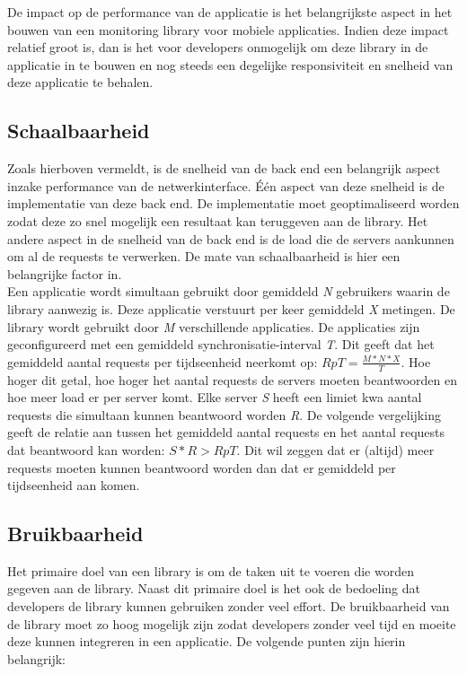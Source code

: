 De impact op de performance van de applicatie is het belangrijkste aspect in het bouwen van een monitoring library voor mobiele applicaties. Indien deze impact relatief groot is, dan is het voor developers onmogelijk om deze library in de applicatie in te bouwen en nog steeds een degelijke responsiviteit en snelheid van deze applicatie te behalen. 

\subsection{Schaalbaarheid}
Zoals hierboven vermeldt, is de snelheid van de back end een belangrijk aspect inzake performance van de netwerkinterface. \'E\'en aspect van deze snelheid is de implementatie van deze back end. De implementatie moet geoptimaliseerd worden zodat deze zo snel mogelijk een resultaat kan teruggeven aan de library. Het andere aspect in de snelheid van de back end is de load die de servers aankunnen om al de requests te verwerken. De mate van schaalbaarheid is hier een belangrijke factor in. \\

Een applicatie wordt simultaan gebruikt door gemiddeld \textit{N} gebruikers waarin de library aanwezig is. Deze applicatie verstuurt per keer gemiddeld \textit{X} metingen. De library wordt gebruikt door \textit{M} verschillende applicaties. De applicaties zijn geconfigureerd met een gemiddeld synchronisatie-interval \textit{T}. Dit geeft dat het gemiddeld aantal requests per tijdseenheid neerkomt op: $RpT=\frac{M*N*X}{T}$. Hoe hoger dit getal, hoe hoger het aantal requests de servers moeten beantwoorden en hoe meer load er per server komt. Elke server \textit{S} heeft een limiet kwa aantal requests die simultaan kunnen beantwoord worden \textit{R}. De volgende vergelijking geeft de relatie aan tussen het gemiddeld aantal requests en het aantal requests dat beantwoord kan worden: $S*R > RpT$. Dit wil zeggen dat er (altijd) meer requests moeten kunnen beantwoord worden dan dat er gemiddeld per tijdseenheid aan komen.\\



\subsection{Bruikbaarheid}
Het primaire doel van een library is om de taken uit te voeren die worden gegeven aan de library. Naast dit primaire doel is het ook de bedoeling dat developers de library kunnen gebruiken zonder veel effort. De bruikbaarheid van de library moet zo hoog mogelijk zijn zodat developers zonder veel tijd en moeite deze kunnen integreren in een applicatie. De volgende punten zijn hierin belangrijk: 

